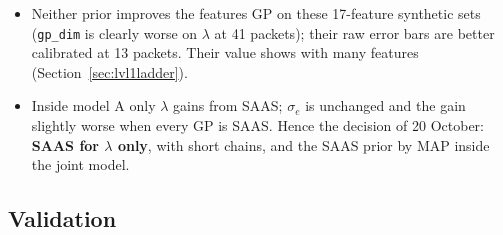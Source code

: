 \documentclass[10pt]{article}
\newcommand{\code}[1]{\texttt{#1}}
\begin{document}
\begin{itemize}
\item Neither prior improves the features GP on these 17-feature synthetic sets (\code{gp\_dim} is clearly worse on $\lambda$ at 41
  packets); their raw error bars are better calibrated at 13 packets. Their value shows with many features (Section~\ref{sec:lvl1ladder}).
\item Inside model A only $\lambda$ gains from SAAS; $\sigma_e$ is unchanged and the gain slightly worse when every GP is SAAS. Hence the
  decision of 20 October: \textbf{SAAS for $\lambda$ only}, with short chains, and the SAAS prior by MAP inside the joint model.
\end{itemize}

\subsection{Validation}
\label{sec:lvl1val}
\end{document}
